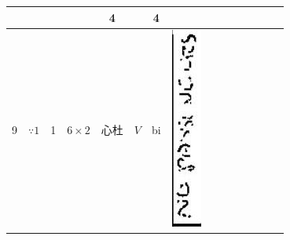 \documentclass[10pt]{article}
\begin{document}
\begin{center}
\begin{tabular}{|c|c|c|c|c|c|c|c|c|c|c|c|c|c|c|}
 &  &  &  & 4 &  & 4 &  \\
\hline
9 & \(\because 1\) & 1 & \(6 \times 2\) & 心杜 & \(V\) & bi & \includegraphics[max width=\textwidth]{2025_02_27_dd68c3d38de88f0516d9g-009(11)}

\end{tabular}
\end{center}
\end{document}
